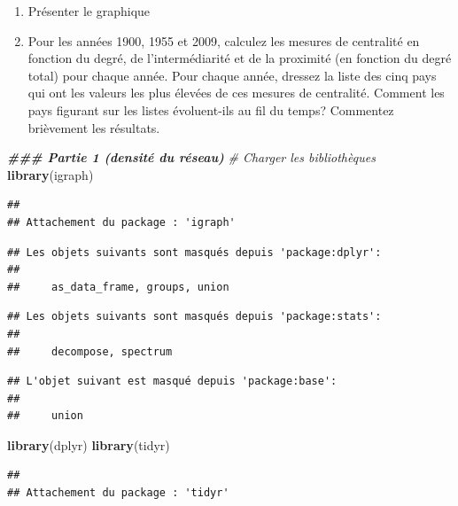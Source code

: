 \documentclass[
]{article}
\newenvironment{Shaded}{\begin{snugshade}}{\end{snugshade}}
\newcommand{\CommentTok}[1]{\textcolor[rgb]{0.56,0.35,0.01}{\textit{#1}}}
\newcommand{\DocumentationTok}[1]{\textcolor[rgb]{0.56,0.35,0.01}{\textbf{\textit{#1}}}}
\newcommand{\FunctionTok}[1]{\textcolor[rgb]{0.13,0.29,0.53}{\textbf{#1}}}
\newcommand{\NormalTok}[1]{#1}
\begin{document}
\begin{enumerate}
\def\labelenumi{\arabic{enumi}.}
\setcounter{enumi}{1}
\item
  Présenter le graphique
\item
  Pour les années 1900, 1955 et 2009, calculez les mesures de centralité
  en fonction du degré, de l'intermédiarité et de la proximité (en
  fonction du degré total) pour chaque année. Pour chaque année, dressez
  la liste des cinq pays qui ont les valeurs les plus élevées de ces
  mesures de centralité. Comment les pays figurant sur les listes
  évoluent-ils au fil du temps? Commentez brièvement les résultats.
\end{enumerate}

\begin{Shaded}
\begin{Highlighting}[]
\DocumentationTok{\#\#\# Partie 1 (densité du réseau)}
\CommentTok{\# Charger les bibliothèques}
\FunctionTok{library}\NormalTok{(igraph)}
\end{Highlighting}
\end{Shaded}

\begin{verbatim}
## 
## Attachement du package : 'igraph'
\end{verbatim}

\begin{verbatim}
## Les objets suivants sont masqués depuis 'package:dplyr':
## 
##     as_data_frame, groups, union
\end{verbatim}

\begin{verbatim}
## Les objets suivants sont masqués depuis 'package:stats':
## 
##     decompose, spectrum
\end{verbatim}

\begin{verbatim}
## L'objet suivant est masqué depuis 'package:base':
## 
##     union
\end{verbatim}

\begin{Shaded}
\begin{Highlighting}[]
\FunctionTok{library}\NormalTok{(dplyr)}
\FunctionTok{library}\NormalTok{(tidyr)}
\end{Highlighting}
\end{Shaded}

\begin{verbatim}
## 
## Attachement du package : 'tidyr'
\end{verbatim}
\end{document}
